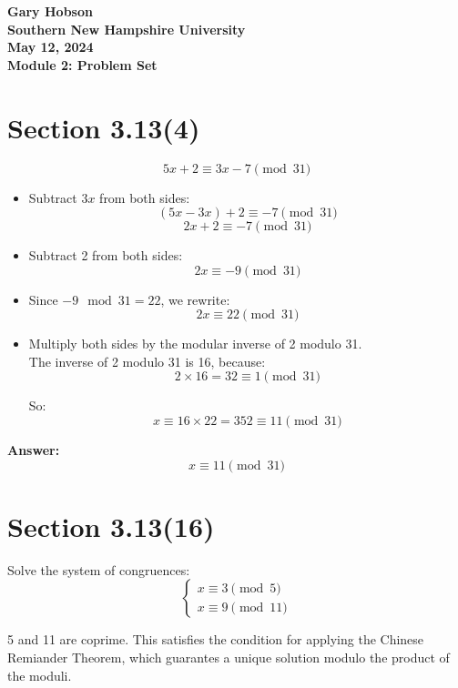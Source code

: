 \documentclass[12pt]{article}
\begin{document}
\begin{center}
    \textbf{Gary Hobson}\\
    \textbf{Southern New Hampshire University} \\
    \textbf{May 12, 2024} \\
    \textbf{Module 2: Problem Set} \\
\end{center}
\section*{Section 3.13(4)}

\[
5x + 2 \equiv 3x - 7 \pmod{31}
\]



\begin{itemize}
    \item Subtract \( 3x \) from both sides:
    \[
    (5x - 3x) + 2 \equiv -7 \pmod{31}
    \]
    \[
    2x + 2 \equiv -7 \pmod{31}
    \]

    \item Subtract 2 from both sides:
    \[
    2x \equiv -9 \pmod{31}
    \]

    \item Since \( -9 \mod 31 = 22 \), we rewrite:
    \[
    2x \equiv 22 \pmod{31}
    \]

    \item Multiply both sides by the modular inverse of 2 modulo 31. \\
    The inverse of 2 modulo 31 is 16, because:
    \[
    2 \times 16 = 32 \equiv 1 \pmod{31}
    \]

    So:
    \[
    x \equiv 16 \times 22 = 352 \equiv 11 \pmod{31}
    \]
\end{itemize}

\textbf{Answer:}
\[
x \equiv 11 \pmod{31}
\]



\section*{Section 3.13(16)}

Solve the system of congruences:
\[
\begin{cases}
x \equiv 3 \pmod{5} \\
x \equiv 9 \pmod{11}
\end{cases}
\]

5 and 11 are coprime. This satisfies the condition for applying the Chinese Remiander Theorem, which guarantes a unique solution modulo the product of the moduli.
\end{document}

